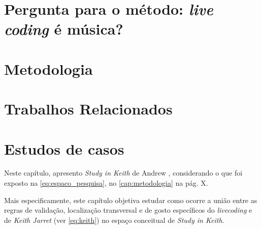 \documentclass[
	12pt,				%
	openright,			%
	twoside,			%
	a4paper,			%
	english,			%
	french,				%
	spanish,			%
        italian,                        %
	brazil				%
	]{abntex2}
\begin{document}



\begingroup
\let\clearpage\relax
\chapter{Pergunta para o método: \emph{live coding} é música?}\label{cap:introducao}



\endgroup

\chapter{Metodologia}\label{cap:metodologia}


\chapter{Trabalhos Relacionados}\label{cap:trabalhos_relacionados}


\chapter{Estudos de casos}\label{cap:estudos_de_caso}

Neste capítulo, apresento \emph{Study in Keith} de Andrew \cite{sorensen_study_2009}, considerando o que foi exposto na \autoref{eq:espaco_pesquisa}, no \autoref{cap:metodologia} na pág. X.

Mais especificamente, este capítulo objetiva estudar como ocorre a união entre as regras de validação, localização transversal e de gosto específicos do \emph{livecoding} e de \emph{Keith Jarret} (ver \autoref{eq:keith}) no espaço conceitual de \emph{Study in Keith}.
\end{document}

